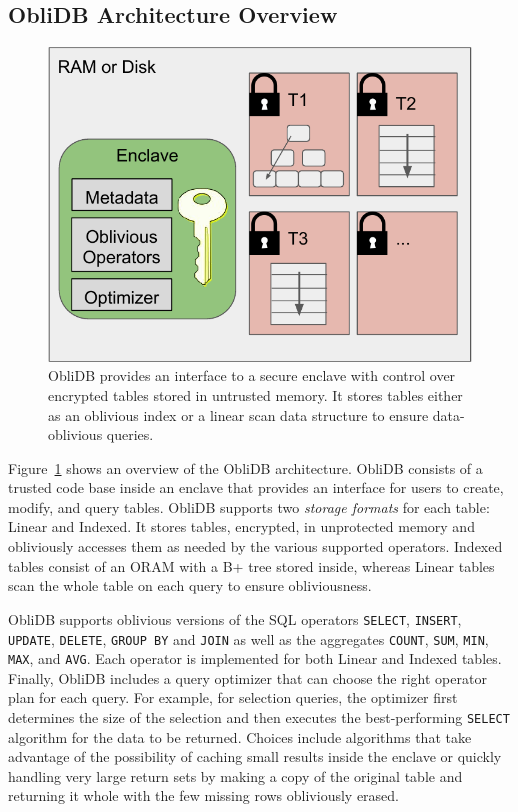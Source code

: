 \documentclass[letterpaper,twocolumn,10pt]{article}
\def\name/{ObliDB}
\begin{document}
\subsection{\name/ Architecture Overview}
\begin{figure}
\includegraphics[width=\linewidth]{figure_revised.pdf}
\caption{\name/ provides an interface to a secure enclave with control over encrypted tables stored in untrusted memory. It stores tables either as an oblivious index or a linear scan data structure to ensure data-oblivious queries.}
\label{arch}
\end{figure}
Figure~\ref{arch} shows an overview of the \name/ architecture. \name/ consists of a trusted code base inside an enclave that provides an interface for users to create, modify, and query tables. \name/ supports two \emph{storage formats} for each table: Linear and Indexed. It stores tables, encrypted, in unprotected memory and obliviously accesses them as needed by the various supported operators. Indexed tables consist of an ORAM with a B+ tree stored inside, whereas Linear tables scan the whole table on each query to ensure obliviousness.

  \name/ supports oblivious versions of the SQL operators \texttt{SELECT}, \texttt{INSERT}, \texttt{UPDATE}, \texttt{DELETE}, \texttt{GROUP BY} and \texttt{JOIN} as well as the aggregates \texttt{COUNT}, \texttt{SUM}, \texttt{MIN}, \texttt{MAX}, and \texttt{AVG}. Each operator is implemented for both Linear and Indexed tables. Finally, ObliDB includes a query optimizer that can choose the right operator plan for each query. For example, for selection queries, the optimizer first determines the size of the selection and then executes the best-performing \texttt{SELECT} algorithm for the data to be returned. Choices include algorithms that take advantage of the possibility of caching small results inside the enclave or quickly handling very large return sets by making a copy of the original table and returning it whole with the few missing rows obliviously erased.
  
\end{document}

